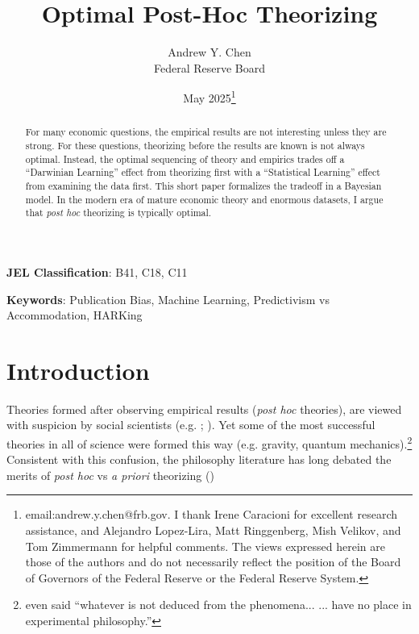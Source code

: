\documentclass[12pt,english]{article}
\theoremstyle{plain}
\theoremstyle{plain}
\begin{document}
\title{Optimal Post-Hoc Theorizing}

\newif\ifanon
\anontrue
\anonfalse %

\ifanon
    \author{}
    \date{}
\else
    \author{{Andrew Y. Chen}\\
    {\normalsize Federal Reserve Board}}
    \date{May 2025\thanks{email:andrew.y.chen@frb.gov. I thank Irene Caracioni for excellent research assistance, and Alejandro Lopez-Lira, Matt Ringgenberg, Mish Velikov, and Tom Zimmermann for helpful comments. The views expressed herein are those of the authors and do not necessarily reflect the position of the Board of Governors of the Federal Reserve or the Federal Reserve System.}}
\fi

\maketitle

 
\begin{abstract}
\begin{singlespace}
\noindent For many economic questions, the empirical results are not interesting unless they are strong. For these questions, theorizing before the results are known is not always optimal. Instead, the optimal sequencing of theory and empirics trades off a ``Darwinian Learning'' effect from theorizing first with a ``Statistical Learning'' effect from examining the data first. This short paper formalizes the tradeoff in a Bayesian model. In the modern era of mature economic theory and enormous datasets, I argue that \emph{post hoc} theorizing is typically optimal.
\end{singlespace}
\end{abstract}
\vspace{10ex}
\textbf{\color{Black}JEL Classification}: B41, C18, C11

\noindent\textbf{\color{Black}Keywords}: Publication Bias, Machine Learning,  Predictivism vs Accommodation, HARKing
\thispagestyle{empty}\setcounter{page}{0}

\vspace{10ex}

\pagebreak{}

\section{Introduction}

\setcounter{page}{1}

Theories formed after observing empirical results (\emph{post hoc} theories), are viewed with suspicion by social scientists (e.g. \citet{kerr1998harking}; \citet{harvey2017presidential}). Yet some of the most successful theories in all of science were formed this way (e.g. gravity, quantum mechanics).\footnote{\citet{newton1726scholium} even said ``whatever is not deduced from the phenomena... ... have no place in experimental philosophy.''} Consistent with this confusion, the philosophy literature has long debated the merits of \emph{post hoc} vs \emph{a priori} theorizing (\citet{barnes2022prediction})
\end{document}
